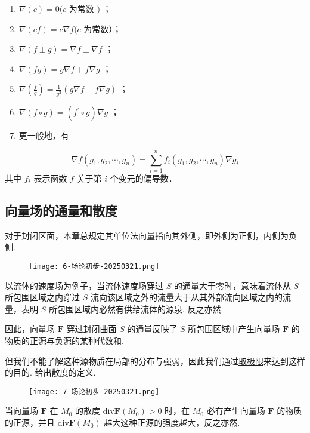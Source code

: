 \begin{enumerate}
	\item $\nabla(c)=0(c$ 为常数 $)$ ；
	\item $\nabla(c f)=c \nabla f(c$ 为常数）；
	\item $\nabla(f \pm g)=\nabla f \pm \nabla f$ ；
	\item $\nabla(f g)=g \nabla f+f \nabla g$ ；
	\item $\nabla\left(\frac{f}{g}\right)=\frac{1}{g^2}(g \nabla f-f \nabla g)$ ；
	\item $\nabla(f \circ g)=\left(f^{\prime} \circ g\right) \nabla g$ ；
	\item 更一般地，有
\end{enumerate}
\[
\nabla f\left(g_1, g_2, \cdots, g_n\right)=\sum_{i=1}^n f_i\left(g_1, g_2, \cdots, g_n\right) \nabla g_i
\]
其中 $f_i$ 表示函数 $f$ 关于第 $i$ 个变元的偏导数．

\subsection{向量场的通量和散度}

对于封闭区面，本章总规定其单位法向量指向其外侧，即外侧为正侧，内侧为负侧.

\begin{figure}[H]
\centering
\texttt{[image: 6-场论初步-20250321.png]}
\label{}
\end{figure}

以流体的速度场为例子，当流体速度场穿过 $S$ 的通量大于零时，意味着流体从 $S$ 所包围区域之内穿过 $S$ 流向该区域之外的流量大于从其外部流向区域之内的流量，表明 $S$ 所包围区域内必然有供给流体的源泉. 反之亦然.

因此，向量场 $\boldsymbol{F}$ 穿过封闭曲面 $S$ 的通量反映了 $S$ 所包围区域中产生向量场 $\boldsymbol{F}$ 的物质的正源与负源的某种代数和.

但我们不能了解这种源物质在局部的分布与强弱，因此我们通过\underline{取极限}来达到这样的目的. 给出散度的定义.

\begin{figure}[H]
\centering
\texttt{[image: 7-场论初步-20250321.png]}
\label{}
\end{figure}

当向量场 $\boldsymbol{F}$ 在 $M_0$ 的散度 $\mathrm{div}\boldsymbol{F}(M_0)>0$ 时，在 $M_0$ 必有产生向量场 $\boldsymbol{F}$ 的物质的正源，并且 $\mathrm{div}\boldsymbol{F}(M_0)$ 越大这种正源的强度越大，反之亦然.

